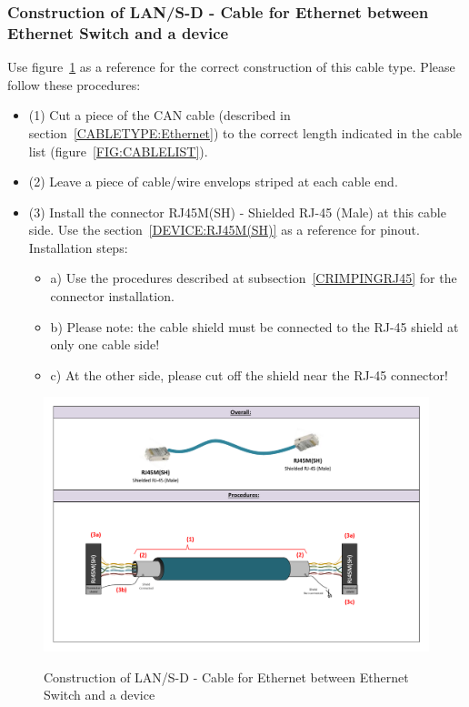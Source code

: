 \subsubsection{Construction of LAN/S-D - Cable for Ethernet between Ethernet Switch and a device} \label{CONSTRUCTION:LANSD}
Use figure~\ref{FIG:LANSDconstruction} as a reference for the correct construction of this cable type. Please follow these procedures:
\begin{itemize}
  \item (1) Cut a piece of the CAN cable (described in section~\ref{CABLETYPE:Ethernet}) to the correct length indicated in the cable list (figure~\ref{FIG:CABLELIST}).
  \item (2) Leave a piece of cable/wire envelops striped at each cable end.
  \item (3) Install the connector RJ45M(SH) - Shielded RJ-45 (Male) at this cable side. Use the section~\ref{DEVICE:RJ45M(SH)} as a reference for pinout. Installation steps:
  \begin{itemize}
    \item a) Use the procedures described at subsection~\ref{CRIMPINGRJ45} for the connector installation.
    \item b) Please note: the cable shield must be connected to the RJ-45 shield at only one cable side!
    \item c) At the other side, please cut off the shield near the RJ-45 connector!
  \end{itemize}
\end{itemize}
\begin{figure}
  \centering
  \includegraphics[angle=90,width=1\columnwidth]{figs/body03/FIGLANSDconstruction.pdf}\\
  \caption[Construction of LAN/S-D - Cable for Ethernet between Ethernet Switch and a device]{Construction of LAN/S-D - Cable for Ethernet between Ethernet Switch and a device}
  \label{FIG:LANSDconstruction}
\end{figure}


